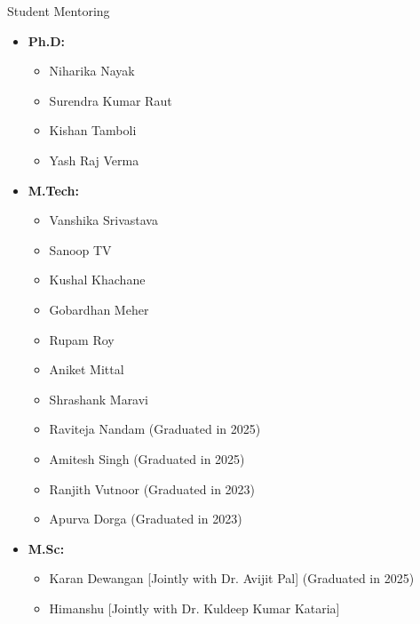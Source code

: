 \documentclass{resume} %
\begin{document}
\begin{rSection}{Student Mentoring}
	\begin{itemize}
		\item \textbf{Ph.D:}
		\begin{itemize}
			\item Niharika Nayak
			\item Surendra Kumar Raut
			\item Kishan Tamboli
			\item Yash Raj Verma			
		\end{itemize}
		\item \textbf{M.Tech:}
		\begin{itemize}		
			\item Vanshika Srivastava
			\item Sanoop TV
			\item Kushal Khachane
			\item Gobardhan Meher 
			\item Rupam Roy 
			\item Aniket Mittal 
			\item Shrashank Maravi 
			\item Raviteja Nandam  (Graduated in 2025)
			\item Amitesh Singh (Graduated in 2025)
			\item Ranjith Vutnoor (Graduated in 2023)
			\item Apurva Dorga  (Graduated in 2023)
		\end{itemize}
		\item \textbf{M.Sc:}
		\begin{itemize}
			\item Karan Dewangan [Jointly with Dr. Avijit Pal] (Graduated in 2025)
			\item Himanshu [Jointly with Dr. Kuldeep Kumar Kataria]
		\end{itemize}
	\end{itemize}
\end{rSection}

\end{document}
